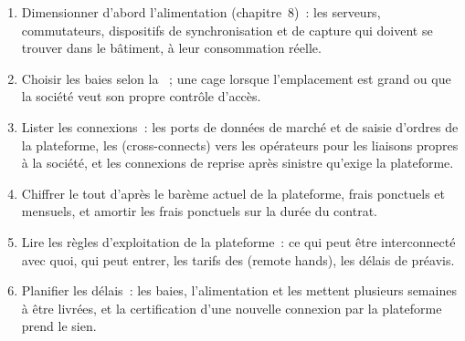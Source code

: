 \begin{method}\label{met:nw:colocation-products-and-how-they-are-sold:buy}
\begin{enumerate}
\item Dimensionner d'abord l'alimentation (chapitre~8)~: les serveurs, commutateurs, dispositifs de synchronisation et de capture qui doivent se trouver dans le bâtiment, à leur consommation réelle.
\item Choisir les baies selon la ~; une cage lorsque l'emplacement est grand ou que la société veut son propre contrôle d'accès.
\item Lister les connexions~: les ports de données de marché et de saisie d'ordres de la plateforme, les  (cross-connects) vers les opérateurs pour les liaisons propres à la société, et les
  connexions de reprise après sinistre qu'exige la plateforme.
\item Chiffrer le tout d'après le barème actuel de la plateforme, frais ponctuels et mensuels, et amortir les frais ponctuels sur la durée du contrat.
\item Lire les règles d'exploitation de la plateforme~: ce qui peut être interconnecté avec quoi, qui peut entrer, les tarifs des  (remote hands), les délais de préavis.
\item Planifier les délais~: les baies, l'alimentation et les  mettent plusieurs semaines à être livrées, et la certification d'une nouvelle connexion
  par la plateforme prend le sien.
\end{enumerate}
\end{method}

